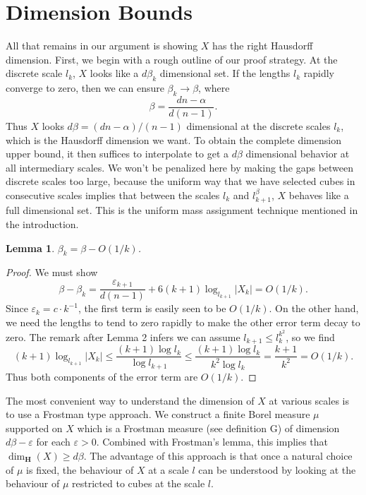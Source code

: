 \documentclass[dvipsnames]{article}
\theoremstyle{plain}
\newtheorem{lemma}{Lemma}
\theoremstyle{plain}
\begin{document}
\section{Dimension Bounds}

All that remains in our argument is showing $X$ has the right Hausdorff dimension. First, we begin with a rough outline of our proof strategy. At the discrete scale $l_k$, $X$ looks like a $d \beta_k$ dimensional set. If the lengths $l_k$ rapidly converge to zero, then we can ensure $\beta_k \to \beta$, where
%
\[ \beta = \frac{dn - \alpha}{d(n - 1)}. \]
%
Thus $X$ looks $d \beta = (dn - \alpha) / (n-1)$ dimensional at the discrete scales $l_k$, which is the Hausdorff dimension we want. To obtain the complete dimension upper bound, it then suffices to interpolate to get a $d\beta$ dimensional behavior at all intermediary scales. We won't be penalized here by making the gaps between discrete scales too large, because the uniform way that we have selected cubes in consecutive scales implies that between the scales $l_k$ and $l_{k+1}^\beta$, $X$ behaves like a full dimensional set. This is the uniform mass assignment technique mentioned in the introduction.

\begin{lemma}
	$\beta_k = \beta - O(1/k)$.
\end{lemma}
\begin{proof}
	We must show
	\[ \beta - \beta_k = \frac{\varepsilon_{k+1}}{d(n-1)} + 6(k+1) \log_{l_{k+1}} |X_k| = O(1/k). \]
	Since $\varepsilon_k = c \cdot k^{-1}$, the first term is easily seen to be $O(1/k)$. On the other hand, we need the lengths to tend to zero rapidly to make the other error term decay to zero. The remark after Lemma 2 infers we can assume $l_{k+1} \leq l_k^{k^2}$, so we find
	\[ (k+1) \log_{l_{k+1}} |X_k| \leq \frac{(k+1) \log l_k}{\log l_{k+1}} \leq \frac{(k+1) \log l_k}{k^2 \log l_k} = \frac{k+1}{k^2} = O(1/k). \]
	Thus both components of the error term are $O(1/k)$.
\end{proof}

The most convenient way to understand the dimension of $X$ at various scales is to use a Frostman type approach. We construct a finite Borel measure $\mu$ supported on $X$ which is a Frostman measure (see definition G) of dimension $d \beta - \varepsilon$ for each $\varepsilon > 0$. Combined with Frostman's lemma, this implies that $\dim_{\mathbf{H}}(X) \geq d \beta$. The advantage of this approach is that once a natural choice of $\mu$ is fixed, the behaviour of $X$ at a scale $l$ can be understood by looking at the behaviour of $\mu$ restricted to cubes at the scale $l$.
\end{document}
